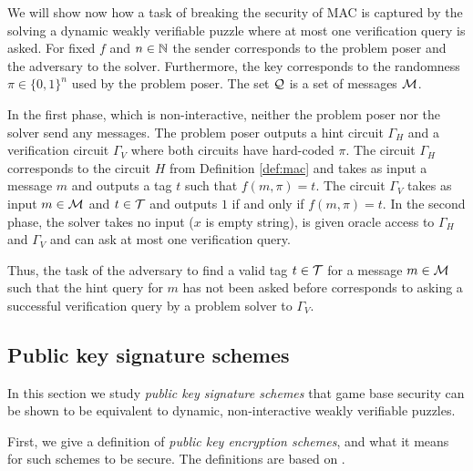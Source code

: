 We will show now how a task of breaking the security of MAC is captured by the solving a dynamic weakly verifiable puzzle
where at most one verification query is asked.
For fixed $f$ and $n \in \mathbb{N}$ the sender corresponds to the problem poser and the adversary to the solver.
Furthermore, the key corresponds to the randomness $\pi \in \{0,1\}^{n}$ used by the problem poser.
The set $\mathcal{Q}$ is a set of messages $\mathcal{M}$.

In the first phase, which is non-interactive, neither the problem poser nor the solver send any messages.
The problem poser outputs a hint circuit $\Gamma_H$ and a verification circuit $\Gamma_V$ where both circuits
have hard-coded $\pi$.
The circuit $\Gamma_H$ corresponds to the circuit $H$ from Definition \ref{def:mac} and takes as input
a message $m$ and outputs a tag $t$ such that $f(m, \pi) = t$.
The circuit $\Gamma_V$ takes as input $m \in \mathcal{M}$ and $t \in \mathcal{T}$ and outputs $1$ if and only if $f(m, \pi) = t$.
In the second phase, the solver takes no input ($x$ is empty string), is given oracle access to $\Gamma_H$ and $\Gamma_V$ and
can ask at most one verification query.

Thus, the task of the adversary to find a valid tag $t \in \mathcal{T}$ for a message $m \in \mathcal{M}$ such that the hint query for $m$
has not been asked before corresponds to asking a successful verification query by a problem solver to $\Gamma_V$.
%
\subsection{Public key signature schemes}
In this section we study \textit{public key signature schemes} that game base security can be shown to be equivalent
to dynamic, non-interactive weakly verifiable puzzles.

First, we give a definition of \textit{public key encryption schemes}, and what it means for such schemes to be secure.
The definitions are based on \cite{Goldreich:2004:FCV:975541}.

